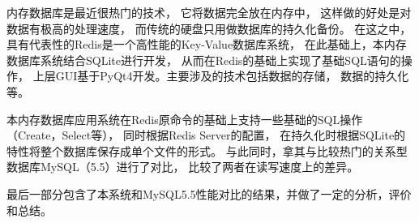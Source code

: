 \begin{abstractc}
内存数据库是最近很热门的技术，
它将数据完全放在内存中，
这样做的好处是对数据有极高的处理速度，
而传统的硬盘只用做数据库的持久化备份。
在这之中，具有代表性的Redis是一个高性能的Key-Value数据库系统，
在此基础上，本内存数据库系统结合SQLite进行开发，
从而在Redis的基础上实现了基础SQL语句的操作，
上层GUI基于PyQt4开发。主要涉及的技术包括数据的存储，
数据的持久化等。

本内存数据库应用系统在Redis原命令的基础上支持一些基础的SQL操作（Create，Select等），
同时根据Redis Server的配置，
在持久化时根据SQLite的特性将整个数据库保存成单个文件的形式。
与此同时，拿其与比较热门的关系型数据库MySQL（5.5）进行了对比，
比较了两者在读写速度上的差异。

最后一部分包含了本系统和MySQL5.5性能对比的结果，并做了一定的分析，评价和总结。



\end{abstractc}
